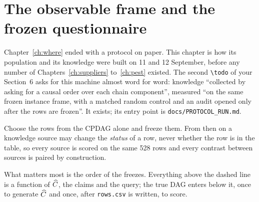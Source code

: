 \chapter{The observable frame and the frozen questionnaire}\label{ch:frame}

Chapter~\ref{ch:where} ended with a protocol on paper. This chapter is how its population and its
knowledge were built on 11 and 12 September, before any number of Chapters~\ref{ch:suppliers}
to~\ref{ch:pest} existed. The second \texttt{\textbackslash todo} of your Section~6 asks for this
machine almost word for word: knowledge ``collected by asking for a causal order over each chain
component'', measured ``on the same frozen instance frame, with a matched random control and an audit
opened only after the rows are frozen''. It exists; its entry point is \texttt{docs/PROTOCOL\_RUN.md}.

\begin{ideia}
Choose the rows from the CPDAG alone and freeze them. From then on a knowledge source may change the
\emph{status} of a row, never whether the row is in the table, so every source is scored on the same
528 rows and every contrast between sources is paired by construction.
\end{ideia}

What matters most is the order of the freezes. Everything above the dashed line is a function of
$\widehat{C}$, the claims and the query; the true DAG enters below it, once to generate $\widehat{C}$ and once,
after \texttt{rows.csv} is written, to score.

